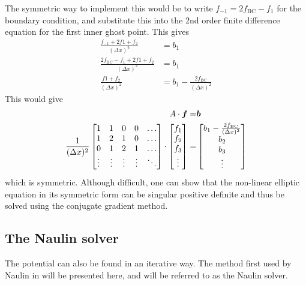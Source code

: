 The symmetric way to implement this would be to write $f_{-1}=2f_{\text{BC}}-f_{1}$ for the boundary condition, and substitute this into the 2nd order finite difference equation for the first inner ghost point.
This gives
%
\begin{align*}
    \frac{f_{-1}+2f{1}+f_{2}}{(\Delta x)^2}&=b_1\\
    \frac{2f_{\text{BC}}-f_{1}+2f{1}+f_{2}}{(\Delta x)^2}&=b_1\\
    \frac{f{1}+f_{2}}{(\Delta x)^2}&=b_1 - \frac{2f_{\text{BC}}}{(\Delta x)^2}
\end{align*}
%
This would give
%
\begin{align*}
    A\cdot\boldsymbol{f}=&\boldsymbol{b}\\
    \frac{1}{(\Delta x)^2}
    \begin{bmatrix}
        1                       & 1                       & 0 & 0 & \ldots\\
        1                       & 2                       & 1 & 0 & \ldots\\
        0                       & 1                       & 2 & 1 & \ldots\\
        \vdots                  & \vdots              &\vdots&\vdots&\ddots\\
    \end{bmatrix}
    \cdot
    \begin{bmatrix}
        f_{1}\\
        f_{2}\\
        f_{3}\\
        \vdots
    \end{bmatrix}
    =&
    \begin{bmatrix}
        b_{1} - \frac{2f_{\text{BC}}}{(\Delta x)^2}\\
        b_{2}\\
        b_{3}\\
        \vdots
    \end{bmatrix}
\end{align*}
%
which is symmetric.
Although difficult, one can show that the non-linear elliptic equation in its symmetric form can be singular positive definite and thus be solved using the conjugate gradient method.

\subsection{The Naulin solver}
\label{sec:NaulinSolver}
%
The potential can also be found in an iterative way.
The method first used by Naulin in \cite{Naulin2008} will be presented here, and will be referred to as the Naulin solver.

